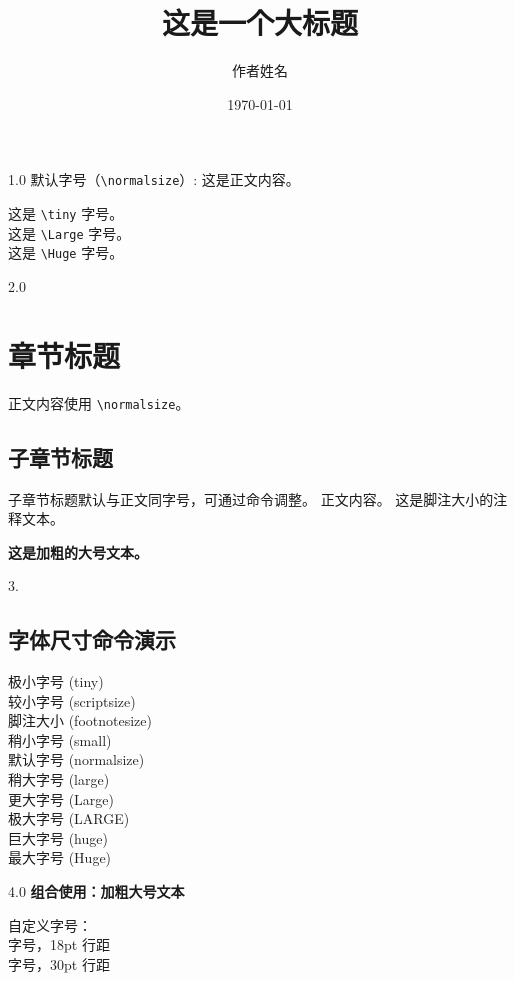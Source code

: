 \documentclass[UTF8]{ctexart}
\begin{document}
1.0
默认字号（\texttt{\textbackslash normalsize}）: 这是正文内容。

{\tiny 这是 \texttt{\textbackslash tiny} 字号。} \\
{\Large 这是 \texttt{\textbackslash Large} 字号。} \\
{\Huge 这是 \texttt{\textbackslash Huge} 字号。}

\vspace{2\baselineskip}
2.0
\title{\Huge 这是一个大标题}
\author{\Large 作者姓名}
\date{\small \today}
\maketitle

\section{章节标题} %
正文内容使用 \texttt{\textbackslash normalsize}。

\subsection{子章节标题}
子章节标题默认与正文同字号，可通过命令调整。
正文内容。
{\footnotesize 这是脚注大小的注释文本。}

{\bfseries\Large 这是加粗的大号文本。} %

\vspace{2\baselineskip}
3.
\begin{center}
    \section*{字体尺寸命令演示} %
\end{center}

\begin{center}
    {\tiny 极小字号 (tiny)} \\
    {\scriptsize 较小字号 (scriptsize)} \\
    {\footnotesize 脚注大小 (footnotesize)} \\
    {\small 稍小字号 (small)} \\
    {\normalsize 默认字号 (normalsize)} \\
    {\large 稍大字号 (large)} \\
    {\Large 更大字号 (Large)} \\
    {\LARGE 极大字号 (LARGE)} \\
    {\huge 巨大字号 (huge)} \\
    {\Huge 最大字号 (Huge)}
\end{center}

\vspace{1em}
4.0
{\bfseries\Large 组合使用：加粗大号文本}

\vspace{1em}
\noindent 自定义字号： \\
{\fontsize{15}{18}\selectfont 15pt 字号，18pt 行距} \\
{\fontsize{25}{30}\selectfont 25pt 字号，30pt 行距}
\end{document}
